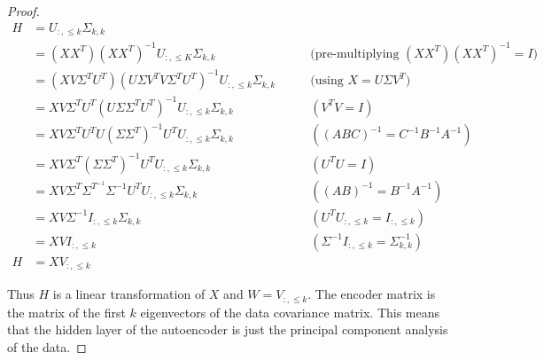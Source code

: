 \begin{proof}
    \begin{align*}
        H &= U_{:,\leq k}\Sigma_{k,k} \\
        &= (XX^T)(XX^T)^{-1}U_{:,\leq K}\Sigma_{k,k} \qquad &\text{(pre-multiplying $(XX^T)(XX^T)^{-1} = I$)} \\
        &= (XV\Sigma^T U^T)(U\Sigma V^T V\Sigma^T U^T)^{-1}U_{:,\leq k}\Sigma_{k,k} \qquad &\text{(using $X = U\Sigma V^T$)} \\
        &= XV\Sigma^T U^T(U\Sigma\Sigma^T U^T)^{-1}U_{:,\leq k}\Sigma_{k,k} \qquad &(V^T V = I) \\
        &= XV\Sigma^T U^T U(\Sigma\Sigma^T)^{-1}U^T U_{:,\leq k}\Sigma_{k,k} \qquad &((ABC)^{-1} = C^{-1}B^{-1}A^{-1}) \\
        &= XV\Sigma^T (\Sigma\Sigma^T)^{-1}U^T U_{:,\leq k}\Sigma_{k,k} \qquad &(U^T U = I) \\
        &= XV\Sigma^T \Sigma^{T^{-1}}\Sigma^{-1}U^T U_{:,\leq k}\Sigma_{k,k} \qquad &((AB)^{-1} = B^{-1}A^{-1}) \\
        &= XV\Sigma^{-1} I_{:,\leq k}\Sigma_{k,k} \qquad &(U^T U_{:,\leq k} = I_{:,\leq k}) \\
        &= XV I_{:,\leq k} \qquad &(\Sigma^{-1} I_{:,\leq k} = \Sigma_{k,k}^{-1}) \\
        H &= XV_{:,\leq k}
        \end{align*}

        Thus $H$ is a linear transformation of $X$ and $W = V_{:,\leq k}$. The encoder matrix is the matrix of the first $k$ eigenvectors of the data covariance matrix. This means that the hidden layer of the autoencoder is just the principal component analysis of the data.  
\end{proof}
